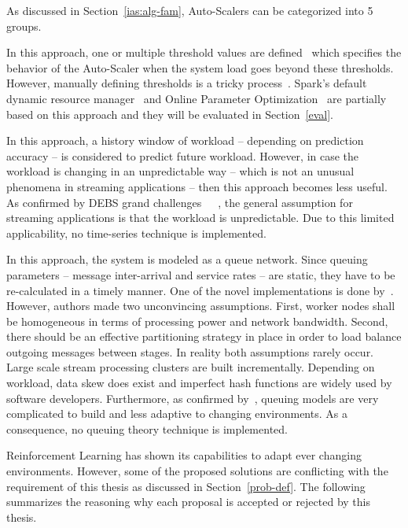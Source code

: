 As discussed in Section~\ref{ias:alg-fam}, Auto-Scalers can be categorized into 5 groups.
\begin{description}[leftmargin=0pt]
    \item[Threshold-Based] In this approach, one or multiple threshold values are defined~\cite{Hasan2012IntegratedAA} which specifies the behavior of the Auto-Scaler when the system load goes beyond these thresholds. However, manually defining thresholds is a tricky process~\cite{Dutreilh2010}. Spark's default dynamic resource manager~\cite{spark} and Online Parameter Optimization~\cite{Heinze:2015} are partially based on this approach and they will be evaluated in Section~\ref{eval}.
    \item[Time-Series Analysis] In this approach, a history window of workload -- depending on prediction accuracy -- is considered to predict future workload. However, in case the workload is changing in an unpredictable way -- which is not an unusual phenomena in streaming applications -- then this approach becomes less useful. As confirmed by DEBS grand challenges~\cite{debs2014}~\cite{debs2015}~\cite{debs2016}, the general assumption for streaming applications is that the workload is unpredictable. Due to this limited applicability, no time-series technique is implemented.
    \item[Queuing Theory] In this approach, the system is modeled as a queue network. Since queuing parameters -- message inter-arrival and service rates --  are static, they have to be re-calculated in a timely manner. One of the novel implementations is done by~\textcite{Lohrmann:2015}. However, authors made two unconvincing assumptions. First, worker nodes shall be homogeneous in terms of processing power and network bandwidth. Second, there should be an effective partitioning strategy in place in order to load balance outgoing messages between stages. In reality both assumptions rarely occur. Large scale stream processing clusters are built incrementally. Depending on workload, data skew does exist and imperfect hash functions are widely used by software developers. Furthermore, as confirmed by~\textcite{Rajarshi:2005}, queuing models are very complicated to build and less adaptive to changing environments. As a consequence, no queuing theory technique is implemented.
    \item[Reinforcement Learning] Reinforcement Learning has shown its capabilities to adapt ever changing environments. However, some of the proposed solutions are conflicting with the requirement of this thesis as discussed in Section~\ref{prob-def}. The following summarizes the reasoning why each proposal is accepted or rejected by this thesis.

\end{description}
